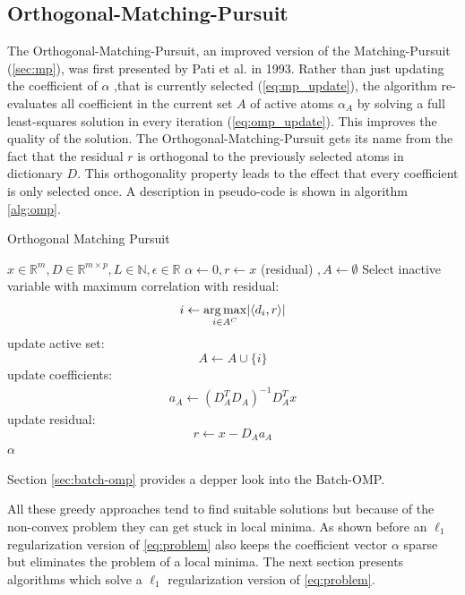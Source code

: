 \subsection{Orthogonal-Matching-Pursuit}
\label{sec:omp}
The Orthogonal-Matching-Pursuit, an improved version of
the Matching-Pursuit (\ref{sec:mp}), was first presented by Pati et al.
in 1993\cite{Pati1993}. Rather than just updating the coefficient of $\alpha$
,that is currently selected (\ref{eq:mp_update}), the algorithm re-evaluates
all coefficient in the current set $A$ of active atoms 
$\alpha_A$ by solving a full least-squares solution in every iteration
(\ref{eq:omp_update}). This improves the quality of the
solution\cite{Pati1993}. The Orthogonal-Matching-Pursuit gets its name from
the fact that the residual $r$ is orthogonal to the previously selected atoms
in dictionary $D$. This orthogonality property leads to the effect that every
coefficient is only selected once. A description in pseudo-code is shown in
algorithm \ref{alg:omp}.
\begin{algorithm}[H]
\caption{Orthogonal Matching Pursuit}
\label{alg:omp}
\begin{algorithmic}[1]
\REQUIRE $x \in \mathbb{R}^m, D \in \mathbb{R}^{m\times p}, L \in \mathbb{N},
\epsilon \in \mathbb{R}$
\STATE $\alpha \gets 0, r \gets x $ (residual) $, A \gets \emptyset$
\STATE Select inactive variable with maximum correlation with residual: 
\begin{equation*}
i \gets \operatorname*{arg\,max}_{i \in A^C} \lvert \left<d_i,r\right> \rvert
\end{equation*}
\STATE update active set:
\begin{equation*}
 A \gets A \cup \{i\} 
\end{equation*}
\STATE update coefficients: 
\begin{align}
a_A \gets \left( D_A^T D_A \right)^{-1} D_A^T x  \label{eq:omp_update}
\end{align}\label{alg:OMP_DTD}
\STATE update residual:
\begin{equation*}
 r \gets x-D_Aa_A
\end{equation*}
\ENDFOR
\RETURN $\alpha$
\end{algorithmic}
\end{algorithm}

Section \ref{sec:batch-omp} provides a
depper look into the Batch-OMP.


All these greedy approaches tend to find suitable solutions but
because of the non-convex problem they can get stuck in local minima. As shown
before an $\ell_1$ regularization version of \ref{eq:problem} also keeps the
coefficient vector $\alpha$ sparse but eliminates the problem of a local minima.
The next section presents algorithms which solve  a $\ell_1$ regularization
version of \ref{eq:problem}.



